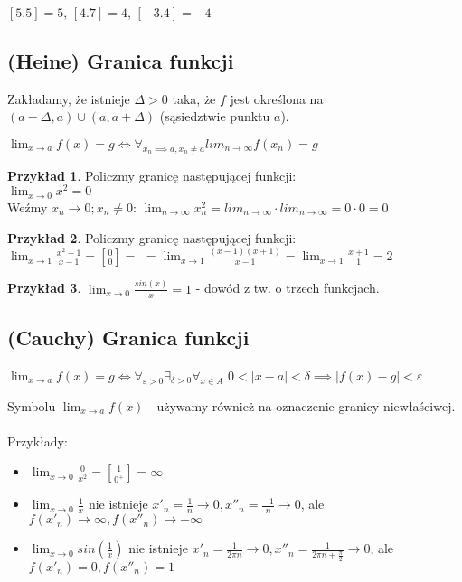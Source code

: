 \documentclass{article}
\theoremstyle{definition}
\theoremstyle{definition}
\theoremstyle{definition}
\newtheorem{pk}{Przykład}[subsection]
\theoremstyle{definition}
\begin{document}
$[5.5]=5$, $[4.7]=4$, $[-3.4]=-4$

\subsection{(Heine) Granica funkcji}

Zakładamy, że istnieje $\Delta>0$ taka, że $f$ jest określona na $(a-\Delta,a)\cup(a,a+\Delta)$ (sąsiedztwie punktu $a$).
\begin{center}
    $\lim_{x\rightarrow a} f(x) = g \iff \forall_{x_n\implies a, x_n\neq a} lim_{n\rightarrow \infty} f(x_n) = g$
\end{center}

\begin{pk}
    Policzmy granicę następującej funkcji:\\
    $\lim_{x\rightarrow 0} x^2 = 0$\\
    Weźmy $x_n \rightarrow 0; x_n \neq 0$:
    $\lim_{n\rightarrow \infty} x_n^{2} = lim_{n\rightarrow \infty}\cdot lim_{n\rightarrow \infty} = 0\cdot 0 = 0$
\end{pk}

\begin{pk}
    Policzmy granicę następującej funkcji:\\
    $\lim_{x\rightarrow 1} \frac{x^2-1}{x-1} = \left[\frac{0}{0}\right] =$
    $=\lim_{x\rightarrow 1} \frac{(x-1)(x+1)}{x-1} = \lim_{x\rightarrow 1} \frac{x+1}{1} = 2$
\end{pk}

\begin{pk}
    $\lim_{x\rightarrow 0} \frac{sin(x)}{x} = 1$ - dowód z tw. o trzech funkcjach.
\end{pk}

\subsection{(Cauchy) Granica funkcji}

\begin{center}
    $\lim_{x\rightarrow a} f(x)=g \iff \forall_{\varepsilon>0} \exists_{\delta>0}\forall_{x\in A}$
    $ 0<|x-a|<\delta \implies |f(x)-g|< \varepsilon$
\end{center}

Symbolu $\lim_{x\rightarrow a} f(x)$ - używamy również na oznaczenie granicy niewłaściwej.\\\\
Przykłady:
\begin{itemize}
    \item $\lim_{x\rightarrow 0} \frac{0}{x^2} = \left[\frac{1}{0^{+}}\right] = \infty$
    \item $\lim_{x\rightarrow 0} \frac{1}{x}$ nie istnieje
    $x'_n = \frac{1}{n} \rightarrow 0, x''_n = \frac{-1}{n} \rightarrow 0$, ale
    $f(x'_n) \rightarrow \infty, f(x''_n) \rightarrow -\infty$
    \item $\lim_{x\rightarrow 0} sin(\frac{1}{x})$ nie istnieje
    $x'_n = \frac{1}{2\pi n} \rightarrow 0, x''_n = \frac{1}{2\pi n + \frac{\pi}{2}} \rightarrow 0$, ale
    $f(x'_n) = 0, f(x''_n) = 1$
\end{itemize}
\end{document}
